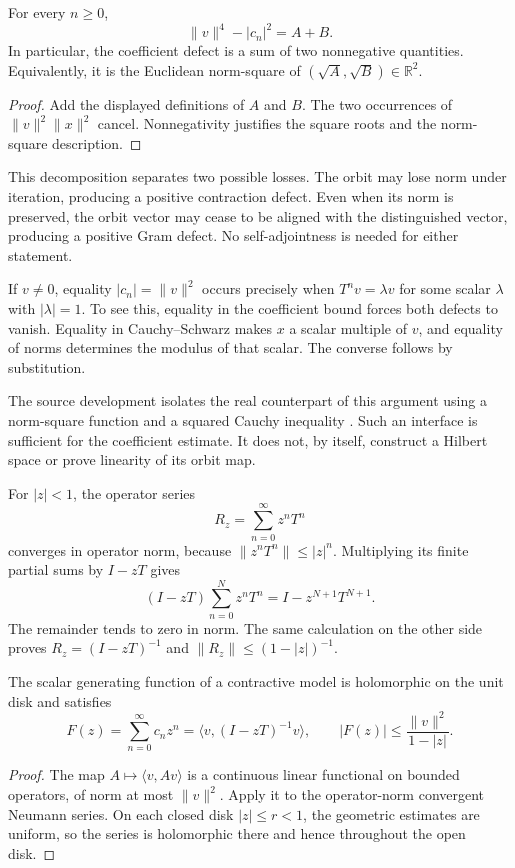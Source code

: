 \begin{proposition}\label{hilb:defect-identity}
For every $n\ge0$,
\[
 \|v\|^4-|c_n|^2=A+B.
\]
In particular, the coefficient defect is a sum of two nonnegative
quantities. Equivalently, it is the Euclidean norm-square of
$(\sqrt A,\sqrt B)\in\mathbb R^2$.
\end{proposition}
\begin{proof}
Add the displayed definitions of $A$ and $B$. The two occurrences of
$\|v\|^2\|x\|^2$ cancel. Nonnegativity justifies the square roots and
the norm-square description.
\end{proof}

This decomposition separates two possible losses. The orbit may lose
norm under iteration, producing a positive contraction defect. Even
when its norm is preserved, the orbit vector may cease to be aligned
with the distinguished vector, producing a positive Gram defect. No
self-adjointness is needed for either statement.

If $v\ne0$, equality $|c_n|=\|v\|^2$ occurs precisely when
$T^nv=\lambda v$ for some scalar $\lambda$ with $|\lambda|=1$.
To see this, equality in the coefficient bound forces both defects to
vanish. Equality in Cauchy--Schwarz makes $x$ a scalar multiple of
$v$, and equality of norms determines the modulus of that scalar.
The converse follows by substitution.

The source development isolates the real counterpart of this argument
using a norm-square function and a squared Cauchy inequality
\cite{source}. Such an interface is sufficient for the coefficient
estimate. It does not, by itself, construct a Hilbert space or prove
linearity of its orbit map.

\label{hilb:neumann}
For $|z|<1$, the operator series
\[
 R_z=\sum_{n=0}^{\infty}z^nT^n
\]
converges in operator norm, because $\|z^nT^n\|\le|z|^n$. Multiplying
its finite partial sums by $I-zT$ gives
\[
 (I-zT)\sum_{n=0}^{N}z^nT^n
 =I-z^{N+1}T^{N+1}.
\]
The remainder tends to zero in norm. The same calculation on the
other side proves $R_z=(I-zT)^{-1}$ and
$\|R_z\|\le(1-|z|)^{-1}$.

\begin{proposition}\label{hilb:disk-resolvent}
The scalar generating function of a contractive model is holomorphic
on the unit disk and satisfies
\[
 F(z)=\sum_{n=0}^{\infty}c_nz^n
     =\langle v,(I-zT)^{-1}v\rangle,\qquad
 |F(z)|\le\frac{\|v\|^2}{1-|z|}.
\]
\end{proposition}
\begin{proof}
The map $A\mapsto\langle v,Av\rangle$ is a continuous linear
functional on bounded operators, of norm at most $\|v\|^2$.
Apply it to the operator-norm convergent Neumann series.
On each closed disk $|z|\le r<1$, the geometric estimates are uniform,
so the series is holomorphic there and hence throughout the open disk.
\end{proof}

